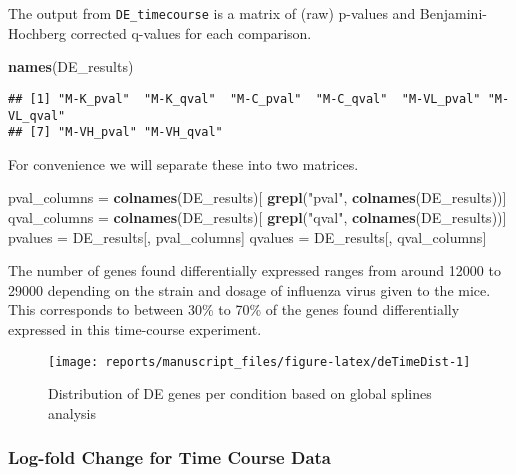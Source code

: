 \documentclass[9pt,a4paper,]{extarticle}
\newenvironment{Shaded}{\begin{snugshade}}{\end{snugshade}}
\newcommand{\KeywordTok}[1]{\textcolor[rgb]{0.13,0.29,0.53}{\textbf{#1}}}
\newcommand{\NormalTok}[1]{#1}
\newcommand{\StringTok}[1]{\textcolor[rgb]{0.31,0.60,0.02}{#1}}
\begin{document}
The output from \texttt{DE\_timecourse} is a matrix of (raw) p-values and Benjamini-Hochberg corrected q-values for each comparison.

\begin{Shaded}
\begin{Highlighting}[]
\KeywordTok{names}\NormalTok{(DE_results)}
\end{Highlighting}
\end{Shaded}

\begin{verbatim}
## [1] "M-K_pval"  "M-K_qval"  "M-C_pval"  "M-C_qval"  "M-VL_pval" "M-VL_qval"
## [7] "M-VH_pval" "M-VH_qval"
\end{verbatim}

For convenience we will separate these into two matrices.

\begin{Shaded}
\begin{Highlighting}[]
\NormalTok{pval_columns =}\StringTok{ }\KeywordTok{colnames}\NormalTok{(DE_results)[}
    \KeywordTok{grepl}\NormalTok{(}\StringTok{"pval"}\NormalTok{, }\KeywordTok{colnames}\NormalTok{(DE_results))]}
\NormalTok{qval_columns =}\StringTok{ }\KeywordTok{colnames}\NormalTok{(DE_results)[}
    \KeywordTok{grepl}\NormalTok{(}\StringTok{"qval"}\NormalTok{, }\KeywordTok{colnames}\NormalTok{(DE_results))]}
\NormalTok{pvalues =}\StringTok{ }\NormalTok{DE_results[, pval_columns]}
\NormalTok{qvalues =}\StringTok{ }\NormalTok{DE_results[, qval_columns]}
\end{Highlighting}
\end{Shaded}

The number of genes found differentially expressed ranges from around 12000 to
29000 depending on the strain and dosage of influenza virus given to the mice.
This corresponds to between 30\% to 70\% of the genes found differentially
expressed in this time-course experiment.

\begin{figure}[H]

{\centering \texttt{[image: reports/manuscript\_files/figure-latex/deTimeDist-1]} 

}

\caption{Distribution of DE genes per condition based on global splines analysis}\label{fig:deTimeDist}
\end{figure}

\hypertarget{log-fold-change-for-time-course-data}{%
\subsubsection{Log-fold Change for Time Course Data}\label{log-fold-change-for-time-course-data}}
\end{document}
